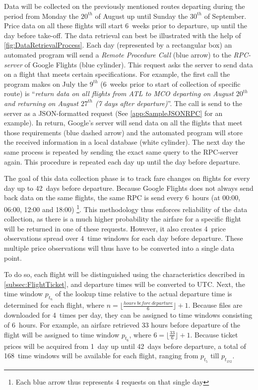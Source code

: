 Data will be collected on the previously mentioned routes departing during the period from Monday the $20^{th}$ of August up until Sunday the $30^{th}$ of September. Price data on all these flights will start 6~weeks prior to departure, up until the day before take-off. The data retrieval can best be illustrated with the help of \autoref{fig:DataRetrievalProcess}. Each day (represented by a rectangular box) an automated program will send a \emph{Remote Procedure Call} (blue arrow) to the \emph{RPC-server} of Google Flights (blue cylinder). This request asks the server to send data on a flight that meets certain specifications. For example, the first call the program makes on July the $9^{th}$ (6~weeks prior to start of collection of specific route) is ``\emph{return data on all flights from ATL to MCO departing on August $20^{th}$ and returning on August $27^{th}$ (7 days after departure)}''. The call is send to the server as a JSON-formatted request (See \autoref{app:SampleJSONRPC} for an example). In return, Google's server will send data on all the flights that meet those requirements (blue dashed arrow) and the automated program will store the received information in a local database (white cylinder). The next day the same process is repeated by sending the exact same query to the RPC-server again. This procedure is repeated each day up until the day before departure.

The goal of this data collection phase is to track fare changes on flights for every day up to 42~days before departure. Because Google Flights does not always send back data on the same flights, the same RPC is send every 6~hours (at 00:00, 06:00, 12:00 and 18:00) \footnote{Each blue arrow thus represents 4 requests on that single day}. This methodology thus enforces reliability of the data collection, as there is a much higher probability the airfare for a specific flight will be returned in one of these requests. However, it also creates 4~price observations spread over 4~time windows for each day before departure. These multiple price observations will thus have to be converted into a single data point.

To do so, each flight will be distinguished using the characteristics described in \autoref{subsec:FlightTicket}, and departure times will be converted to UTC\@. Next, the time window $p_{t_n}$ of the lookup time relative to the actual departure time is determined for each flight, where $n = \lfloor \frac{\scriptstyle{hours\ before\ departure}}{6} \rfloor + 1$. Because files are downloaded for 4~times per day, they can be assigned to time windows consisting of 6~hours. For example, an airfare retrieved 33 hours before departure of the flight will be assigned to time window $p_{t_6}$, where $6 = \lfloor \frac{33}{6} \rfloor + 1$. Because ticket prices will be acquired from 1~day up until 42~days before departure, a total of 168~time windows will be available for each flight, ranging from $p_{t_5}$ till $p_{t_{172}}$.

